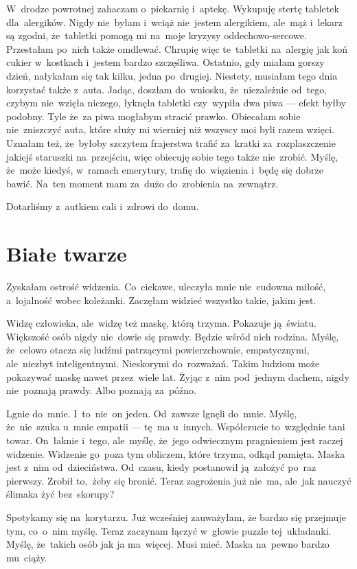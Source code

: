 \documentclass[9pt, a5paper]{memoir}
\begin{document}
W~drodze powrotnej zahaczam o~piekarnię i~aptekę. Wykupuję stertę tabletek dla~alergików. Nigdy nie~byłam i~wciąż nie~jestem alergikiem, ale~mąż i~lekarz są zgodni, że~tabletki pomogą mi na~moje kryzysy oddechowo-sercowe. Przestałam po~nich także omdlewać. Chrupię więc te~tabletki na~alergię jak koń cukier w~kostkach i~jestem bardzo szczęśliwa. Ostatnio, gdy miałam gorszy dzień, nałykałam się tak kilku, jedna po~drugiej. Niestety, musiałam tego dnia korzystać także z~auta. Jadąc, doszłam do~wniosku, że~niezależnie od~tego, czybym nie~wzięła niczego, łyknęła tabletki czy~wypiła dwa piwa --- efekt byłby podobny. Tyle że~za piwa mogłabym stracić prawko. Obiecałam sobie nie~zniszczyć auta, które służy mi wierniej niż wszyscy moi byli razem wzięci. Uznałam też, że~byłoby szczytem frajerstwa trafić za~kratki za~rozplaszczenie jakiejś staruszki na~przejściu, więc obiecuję sobie tego także nie~zrobić. Myślę, że~może kiedyś, w~ramach emerytury, trafię do~więzienia i~będę się dobrze bawić. Na~ten moment mam za~dużo do~zrobienia na~zewnątrz.

Dotarliśmy z~autkiem cali i~zdrowi do~domu.

\newpage
\section{Białe twarze}
Zyskałam ostrość widzenia. Co~ciekawe, uleczyła mnie nie~cudowna miłość, a~lojalność wobec koleżanki. Zaczęłam widzieć wszystko takie, jakim jest.

Widzę człowieka, ale~widzę też maskę, którą trzyma. Pokazuje ją~światu. Większość osób nigdy nie~dowie się prawdy. Będzie wśród nich rodzina. Myślę, że~celowo otacza się ludźmi patrzącymi powierzchownie, empatycznymi, ale~niezbyt inteligentnymi. Nieskorymi do~rozważań. Takim ludziom może pokazywać maskę nawet przez~wiele lat. Żyjąc z~nim pod~jednym dachem, nigdy nie~poznają prawdy. Albo poznają za~późno.

Lgnie do~mnie. I~to~nie~on jeden. Od~zawsze lgnęli do~mnie. Myślę, że~nie~szuka u~mnie empatii --- tę~ma u~innych. Współczucie to~względnie tani towar. On~łaknie i~tego, ale~myślę, że~jego odwiecznym pragnieniem jest raczej widzenie. Widzenie go~poza tym obliczem, które trzyma, odkąd pamięta. Maska jest z~nim od~dzieciństwa. Od~czasu, kiedy postanowił ją~założyć po~raz pierwszy. Zrobił to,~żeby się bronić. Teraz zagrożenia już nie~ma, ale~jak nauczyć ślimaka żyć bez~skorupy?

Spotykamy się na~korytarzu. Już wcześniej zauważyłam, że bardzo się przejmuje tym, co~o~nim myślę. Teraz zaczynam łączyć w~głowie puzzle tej~układanki. Myślę, że~takich osób jak ja ma~więcej. Musi mieć. Maska na~pewno bardzo mu~ciąży.
\end{document}
